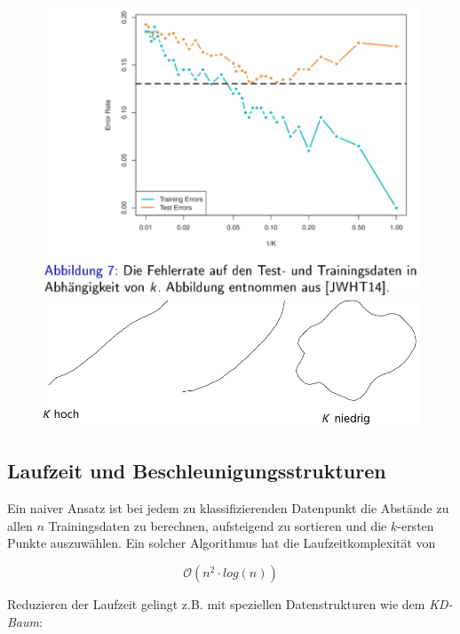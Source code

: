 \documentclass{report}
\begin{document}
  \begin{figure}[H]	
    \centering	
    \begin{minipage}[b]{0.4\textwidth}	
      \includegraphics[scale=.265]{ml05_6}	
    \end{minipage}	
    \hfill	
    \begin{minipage}[b]{0.4\textwidth}	
      \includegraphics[scale=.255]{ml05_8}	
    \end{minipage}	
  \end{figure}	
  
  \subsection{Laufzeit und Beschleunigungsstrukturen}	
  Ein naiver Ansatz ist bei jedem zu klassifizierenden Datenpunkt die Abstände zu allen $n$ Trainingsdaten zu berechnen,	
  aufsteigend zu sortieren und die $k$-ersten Punkte auszuwählen. Ein solcher Algorithmus hat die Laufzeitkomplexität von	
  
  $$\mathcal{O}(n^2\cdot log(n))$$	
  
  Reduzieren der Laufzeit gelingt z.B. mit speziellen Datenstrukturen wie dem \textit{KD-Baum}:	
  
\end{document}
